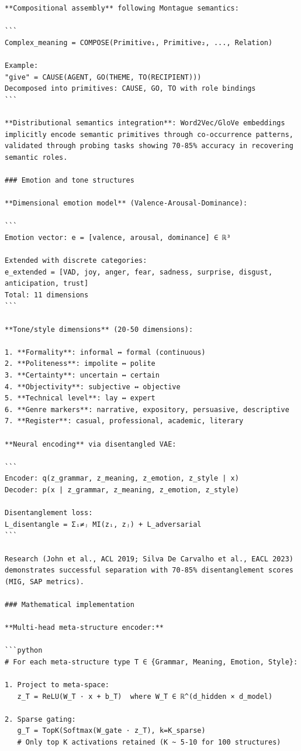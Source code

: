 \documentclass[11pt]{article}
\begin{document}
\begin{verbatim}
**Compositional assembly** following Montague semantics:

```
Complex_meaning = COMPOSE(Primitive₁, Primitive₂, ..., Relation)

Example:
"give" = CAUSE(AGENT, GO(THEME, TO(RECIPIENT)))
Decomposed into primitives: CAUSE, GO, TO with role bindings
```

**Distributional semantics integration**: Word2Vec/GloVe embeddings implicitly encode semantic primitives through co-occurrence patterns, validated through probing tasks showing 70-85% accuracy in recovering semantic roles.

### Emotion and tone structures

**Dimensional emotion model** (Valence-Arousal-Dominance):

```
Emotion vector: e = [valence, arousal, dominance] ∈ ℝ³

Extended with discrete categories:
e_extended = [VAD, joy, anger, fear, sadness, surprise, disgust, anticipation, trust]
Total: 11 dimensions
```

**Tone/style dimensions** (20-50 dimensions):

1. **Formality**: informal ↔ formal (continuous)
2. **Politeness**: impolite ↔ polite
3. **Certainty**: uncertain ↔ certain
4. **Objectivity**: subjective ↔ objective
5. **Technical level**: lay ↔ expert
6. **Genre markers**: narrative, expository, persuasive, descriptive
7. **Register**: casual, professional, academic, literary

**Neural encoding** via disentangled VAE:

```
Encoder: q(z_grammar, z_meaning, z_emotion, z_style | x)
Decoder: p(x | z_grammar, z_meaning, z_emotion, z_style)

Disentanglement loss:
L_disentangle = Σᵢ≠ⱼ MI(zᵢ, zⱼ) + L_adversarial
```

Research (John et al., ACL 2019; Silva De Carvalho et al., EACL 2023) demonstrates successful separation with 70-85% disentanglement scores (MIG, SAP metrics).

### Mathematical implementation

**Multi-head meta-structure encoder:**

```python
# For each meta-structure type T ∈ {Grammar, Meaning, Emotion, Style}:

1. Project to meta-space:
   z_T = ReLU(W_T · x + b_T)  where W_T ∈ ℝ^(d_hidden × d_model)

2. Sparse gating:
   g_T = TopK(Softmax(W_gate · z_T), k=K_sparse)
   # Only top K activations retained (K ~ 5-10 for 100 structures)


\end{verbatim}
\end{document}
